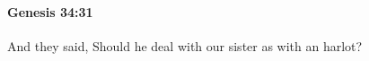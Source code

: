 
		\paragraph{Genesis 34:31} %
			\label{GENESIS-34-31}

			And they said, Should he deal with our sister as with an harlot?

